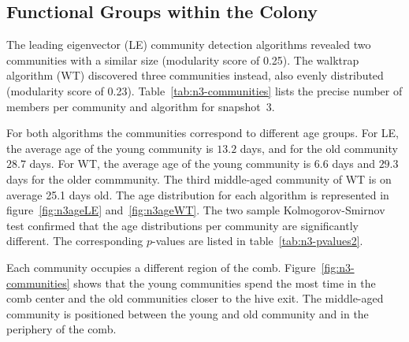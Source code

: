 \subsection{Functional Groups within the Colony}

The leading eigenvector (LE) community detection algorithms revealed two communities with a similar size (modularity score of 0.25). The walktrap algorithm (WT) discovered three communities instead, also evenly distributed (modularity score of 0.23). Table~\ref{tab:n3-communities} lists the precise number of members per community and algorithm for snapshot~3.

For both algorithms the communities correspond to different age groups. For LE, the average age of the young community is $13.2$ days, and for the old community $28.7$ days. For WT, the average age of the young community is $6.6$ days and $29.3$ days for the older commmunity. The third middle-aged community of WT is on average 25.1 days old. The age distribution for each algorithm is represented in figure~\ref{fig:n3ageLE} and~\ref{fig:n3ageWT}. The two sample Kolmogorov-Smirnov test confirmed that the age distributions per community are significantly different. The corresponding $p$-values are listed in table~\ref{tab:n3-pvalues2}.

Each community occupies a different region of the comb.
Figure~\ref{fig:n3-communities} shows that the young communities spend the most time in the comb center and the old communities closer to the hive exit. The middle-aged community is positioned between the young and old community and in the periphery of the comb.




